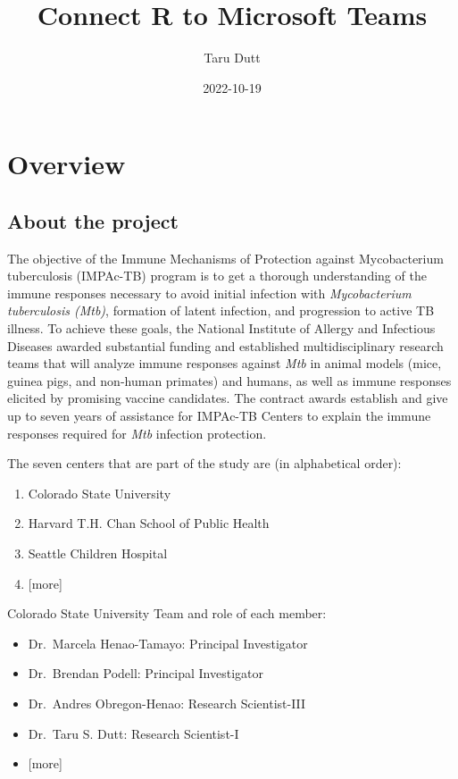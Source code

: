\documentclass[
]{book}
\title{Connect R to Microsoft Teams}
\author{Taru Dutt}
\date{2022-10-19}
\providecommand{\tightlist}{%
  \setlength{\itemsep}{0pt}\setlength{\parskip}{0pt}}
\begin{document}
\maketitle

{
\setcounter{tocdepth}{1}
\tableofcontents
}
\hypertarget{overview}{%
\chapter{Overview}\label{overview}}

\hypertarget{about-the-project}{%
\section{About the project}\label{about-the-project}}

The objective of the Immune Mechanisms of Protection against Mycobacterium tuberculosis (IMPAc-TB) program is to get a thorough understanding of the immune responses necessary to avoid initial infection with \emph{Mycobacterium tuberculosis (Mtb)}, formation of latent infection, and progression to active TB illness. To achieve these goals, the National Institute of Allergy and Infectious Diseases awarded substantial funding and established multidisciplinary research teams that will analyze immune responses against \emph{Mtb} in animal models (mice, guinea pigs, and non-human primates) and humans, as well as immune responses elicited by promising vaccine candidates. The contract awards establish and give up to seven years of assistance for IMPAc-TB Centers to explain the immune responses required for \emph{Mtb} infection protection.

The seven centers that are part of the study are (in alphabetical order):

\begin{enumerate}
\def\labelenumi{\arabic{enumi}.}
\tightlist
\item
  Colorado State University
\item
  Harvard T.H. Chan School of Public Health
\item
  Seattle Children Hospital
\item
  {[}more{]}
\end{enumerate}

Colorado State University Team and role of each member:

\begin{itemize}
\tightlist
\item
  Dr.~Marcela Henao-Tamayo: Principal Investigator
\item
  Dr.~Brendan Podell: Principal Investigator
\item
  Dr.~Andres Obregon-Henao: Research Scientist-III
\item
  Dr.~Taru S. Dutt: Research Scientist-I
\item
  {[}more{]}
\end{itemize}
\end{document}
